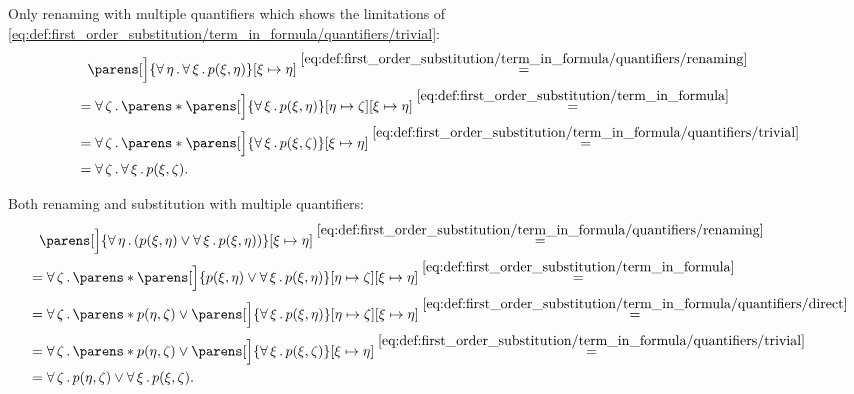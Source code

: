 \begin{example}
\begin{thmenum}
     Only renaming with multiple quantifiers which shows the limitations of \eqref{eq:def:first_order_substitution/term_in_formula/quantifiers/trivial}:
    \begin{align*}
      &{}\phantom{=}{}
      \parens[\Big]{\qforall{\eta} \qforall{\xi} p(\xi, \eta)}[\xi \mapsto \eta]
      \overset {\eqref{eq:def:first_order_substitution/term_in_formula/quantifiers/renaming}} = \\ &=
      \qforall{\zeta} \parens*{ \parens[\Big]{ \qforall{\xi} p(\xi, \eta) }[\eta \mapsto \zeta][\xi \mapsto \eta]}
      \overset {\eqref{eq:def:first_order_substitution/term_in_formula}} = \\ &=
      \qforall{\zeta} \parens*{ \parens[\Big]{ \qforall{\xi} p(\xi, \zeta) }[\xi \mapsto \eta]}
      \overset {\eqref{eq:def:first_order_substitution/term_in_formula/quantifiers/trivial}} = \\ &=
      \qforall{\zeta} \qforall{\xi} p(\xi, \zeta).
    \end{align*}

     Both renaming and substitution with multiple quantifiers:
    \begin{align*}
      &{}\phantom{=}{}
      \parens[\Big]{ \qforall{\eta} (p(\xi, \eta) \vee \qforall{\xi} p(\xi, \eta)) }[\xi \mapsto \eta]
      \overset {\eqref{eq:def:first_order_substitution/term_in_formula/quantifiers/renaming}} = \\ &=
      \qforall{\zeta} \parens*{ \parens[\Big]{ p(\xi, \eta) \vee \qforall{\xi} p(\xi, \eta) }[\eta \mapsto \zeta][\xi \mapsto \eta] }
      \overset {\eqref{eq:def:first_order_substitution/term_in_formula}} = \\ &=
      \qforall{\zeta} \parens*{ p(\eta, \zeta) \vee \parens[\Big]{ \qforall{\xi} p(\xi, \eta) }[\eta \mapsto \zeta][\xi \mapsto \eta] }
      \overset {\eqref{eq:def:first_order_substitution/term_in_formula/quantifiers/direct}} = \\ &=
      \qforall{\zeta} \parens*{ p(\eta, \zeta) \vee \parens[\Big]{ \qforall{\xi} p(\xi, \zeta) }[\xi \mapsto \eta] }
      \overset {\eqref{eq:def:first_order_substitution/term_in_formula/quantifiers/trivial}} = \\ &=
      \qforall{\zeta} p(\eta, \zeta) \vee \qforall{\xi} p(\xi, \zeta).
    \end{align*}


\end{thmenum}
\end{example}
